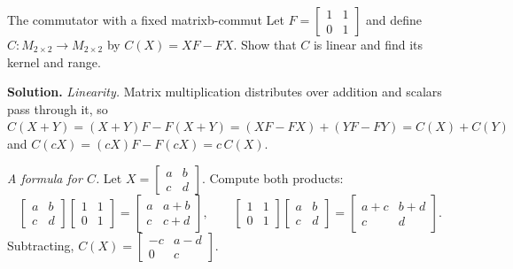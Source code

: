 \documentclass[11pt]{article}
\begin{document}
\begin{exmp}{The commutator with a fixed matrix}{b-commut}
Let $F=\begin{bmatrix}1&1\\0&1\end{bmatrix}$ and define $C:M_{2\times2}\to M_{2\times2}$ by $C(X)=XF-FX$. Show that $C$ is linear and find its kernel and range.

\textbf{Solution.} \emph{Linearity.} Matrix multiplication distributes over addition and scalars pass through it, so $C(X+Y)=(X+Y)F-F(X+Y)=(XF-FX)+(YF-FY)=C(X)+C(Y)$ and $C(cX)=(cX)F-F(cX)=c\,C(X)$.

\emph{A formula for $C$.} Let $X=\begin{bmatrix}a&b\\c&d\end{bmatrix}$. Compute both products:
\[
\begin{bmatrix}a&b\\c&d\end{bmatrix}\begin{bmatrix}1&1\\0&1\end{bmatrix}=\begin{bmatrix}a&a+b\\c&c+d\end{bmatrix},\qquad
\begin{bmatrix}1&1\\0&1\end{bmatrix}\begin{bmatrix}a&b\\c&d\end{bmatrix}=\begin{bmatrix}a+c&b+d\\c&d\end{bmatrix}.
\]
Subtracting, $C(X)=\begin{bmatrix}-c&a-d\\0&c\end{bmatrix}$.


\end{exmp}
\end{document}
